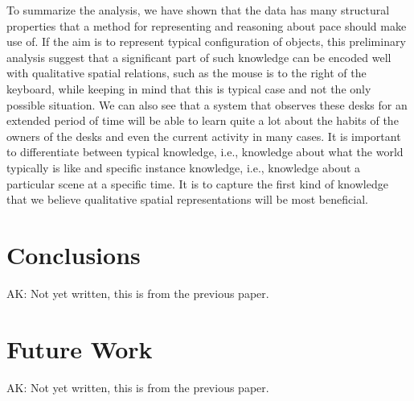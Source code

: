 \documentclass[letterpaper, 10 pt, conference]{ieeeconf}  %
\begin{document}
To summarize the analysis, we have shown that the data has many structural properties that a method for representing and reasoning about 
pace should make use of. If the aim is to represent typical configuration of objects, this preliminary analysis suggest that a significant 
part of such knowledge can be encoded well with qualitative spatial relations, such as the mouse is to the right of the keyboard, while 
keeping in mind that this is typical case and not the only possible situation. We can also see that a system that observes these desks for 
an extended period of time will be able to learn quite a lot about the habits of the owners of the desks and even the current activity in 
many cases. It is important to differentiate between typical knowledge, i.e., knowledge about what the world typically is like and specific 
instance knowledge, i.e., knowledge about a particular scene at a specific time. It is to capture the first kind of knowledge that we 
believe  qualitative spatial representations will be most beneficial. 


\section{Conclusions}
\label{sec:Conclusions}
{\color{blue} AK: Not yet written, this is from the previous paper.}

\section{Future Work}
\label{sec:Future Work}
{\color{blue} AK: Not yet written, this is from the previous paper.}
\end{document}
